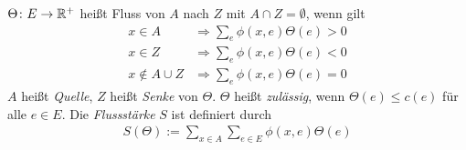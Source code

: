 \begin{definition}
	$\Theta\colon E \to \mathbb{R}^+$ heißt Fluss von $A$ nach $Z$ mit $A \cap Z = \emptyset$, wenn gilt
	\begin{align}
		x \in A &\Rightarrow \sum\limits_{e} \phi(x,e) \Theta(e) > 0 \\
		x \in Z &\Rightarrow \sum\limits_{e} \phi(x,e) \Theta(e) < 0 \\
		x \notin A \cup Z &\Rightarrow \sum\limits_{e} \phi(x,e) \Theta(e) = 0
	\end{align}
	$A$ heißt \emph{Quelle}, $Z$ heißt \emph{Senke} von $\Theta$. $\Theta$ heißt \emph{zulässig}, wenn $\Theta(e) \leq c(e)$ für alle $e \in E$. Die \emph{Flussstärke} $S$ ist definiert durch
	\begin{align}
		S(\Theta):= \sum\limits_{x \in A} \sum\limits_{e \in E} \phi(x,e) \Theta(e)
	\end{align}
\end{definition}
	
